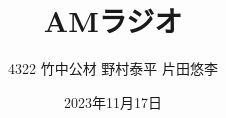 \documentclass[11pt,dvipdfmx]{jarticle}
\begin{document}
\title{AMラジオ}
\author{4322 竹中公材  野村泰平  片田悠李}
\date{2023年11月17日}
\maketitle











\renewcommand{\refname}{参考文献}


\end{document}
